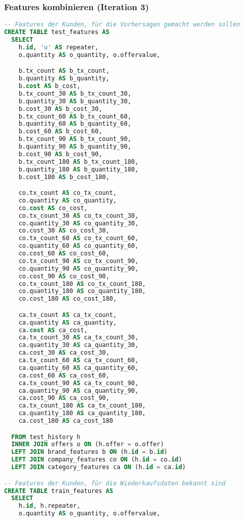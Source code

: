 \subsubsection{Features kombinieren (Iteration 3)}
\label{sql:features_combined_3}
\begin{lstlisting}[language=SQL]
-- Features der Kunden, für die Vorhersagen gemacht werden sollen
CREATE TABLE test_features AS
  SELECT 
    h.id, 'u' AS repeater,
    o.quantity AS o_quantity, o.offervalue,

    b.tx_count AS b_tx_count,
    b.quantity AS b_quantity,
    b.cost AS b_cost,
    b.tx_count_30 AS b_tx_count_30,
    b.quantity_30 AS b_quantity_30,
    b.cost_30 AS b_cost_30,
    b.tx_count_60 AS b_tx_count_60,
    b.quantity_60 AS b_quantity_60,
    b.cost_60 AS b_cost_60,
    b.tx_count_90 AS b_tx_count_90,
    b.quantity_90 AS b_quantity_90,
    b.cost_90 AS b_cost_90,
    b.tx_count_180 AS b_tx_count_180,
    b.quantity_180 AS b_quantity_180,
    b.cost_180 AS b_cost_180,

    co.tx_count AS co_tx_count,
    co.quantity AS co_quantity,
    co.cost AS co_cost,
    co.tx_count_30 AS co_tx_count_30,
    co.quantity_30 AS co_quantity_30,
    co.cost_30 AS co_cost_30,
    co.tx_count_60 AS co_tx_count_60,
    co.quantity_60 AS co_quantity_60,
    co.cost_60 AS co_cost_60,
    co.tx_count_90 AS co_tx_count_90,
    co.quantity_90 AS co_quantity_90,
    co.cost_90 AS co_cost_90,
    co.tx_count_180 AS co_tx_count_180,
    co.quantity_180 AS co_quantity_180,
    co.cost_180 AS co_cost_180,

    ca.tx_count AS ca_tx_count,
    ca.quantity AS ca_quantity,
    ca.cost AS ca_cost,
    ca.tx_count_30 AS ca_tx_count_30,
    ca.quantity_30 AS ca_quantity_30,
    ca.cost_30 AS ca_cost_30,
    ca.tx_count_60 AS ca_tx_count_60,
    ca.quantity_60 AS ca_quantity_60,
    ca.cost_60 AS ca_cost_60,
    ca.tx_count_90 AS ca_tx_count_90,
    ca.quantity_90 AS ca_quantity_90,
    ca.cost_90 AS ca_cost_90,
    ca.tx_count_180 AS ca_tx_count_180,
    ca.quantity_180 AS ca_quantity_180,
    ca.cost_180 AS ca_cost_180

  FROM test_history h
  INNER JOIN offers o ON (h.offer = o.offer)
  LEFT JOIN brand_features b ON (h.id = b.id)
  LEFT JOIN company_features co ON (h.id = co.id)
  LEFT JOIN category_features ca ON (h.id = ca.id)

-- Features der Kunden, für die Wiederkaufsdaten bekannt sind
CREATE TABLE train_features AS
  SELECT 
    h.id, h.repeater,
    o.quantity AS o_quantity, o.offervalue,


\end{lstlisting}
